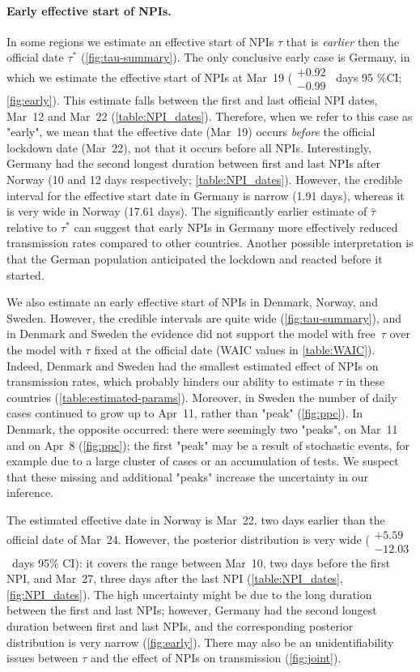 \documentclass[12pt]{extarticle}
\begin{document}
\paragraph*{Early effective start of NPIs.}
In some regions we estimate an effective start of NPIs $\tau$ that is \emph{earlier} then the official date $\tau^*$ (\autoref{fig:tau-summary}).
The only conclusive early case is Germany, in which we estimate the effective start of NPIs at Mar~19 ($\substack{+0.92 \\ -0.99}$~days 95 \%CI; \autoref{fig:early}).
This estimate falls between the first and last official NPI dates, Mar~12 and Mar~22 (\autoref{table:NPI_dates}). Therefore, when we refer to this case as "early", we mean that the effective date (Mar~19) occurs \emph{before} the official lockdown date (Mar~22), not that it occurs before all NPIs.
Interestingly, Germany had the second longest duration between first and last NPIs after Norway (10 and 12 days respectively; \autoref{table:NPI_dates}).
However, the credible interval for the effective start date in Germany is narrow (1.91 days), whereas it is very wide in Norway (17.61 days).
The significantly earlier estimate of $\hat{\tau}$ relative to $\tau^*$ can suggest that early NPIs in Germany more effectively reduced transmission rates compared to other countries. Another possible interpretation is that the German population anticipated the lockdown and reacted before it started.

We also estimate an early effective start of NPIs in Denmark, Norway, and Sweden.
However, the credible intervals are quite wide (\autoref{fig:tau-summary}), and in Denmark and Sweden the evidence did not support the model with free~$\tau$ over the model with $\tau$ fixed at the official date (WAIC values in \autoref{table:WAIC}).
Indeed, Denmark and Sweden had the smallest estimated effect of NPIs on transmission rates, which  probably hinders our ability to estimate $\tau$ in these countries (\autoref{table:estimated-params}).
Moreover, in Sweden the number of daily cases continued to grow up to Apr~11, rather than "peak" (\autoref{fig:ppc}). 
In Denmark, the opposite occurred: there were seemingly two "peaks", on Mar~11 and on Apr~8 (\autoref{fig:ppc}); the first "peak" may be a result of stochastic events, for example due to a large cluster of cases or an accumulation of tests.
We suspect that these missing and additional "peaks" increase the uncertainty in our inference.

The estimated effective date in Norway is Mar~22, two days earlier than the official date of Mar~24.
However, the posterior distribution is very wide ($\substack{+5.59 \\ -12.03}$~days 95\% CI): it covers the range between Mar~10, two days before the first NPI, and Mar~27, three days after the last NPI (\autoref{table:NPI_dates}, \autoref{fig:NPI_dates}). 
The high uncertainty might be due to the long duration between the first and last NPIs; however, Germany had the second longest duration between first and last NPIs, and the corresponding posterior distribution is very narrow (\autoref{fig:early}).
There may also be an unidentifiability issues between $\tau$ and the effect of NPIs on transmission (\autoref{fig:joint}). 
\end{document}
